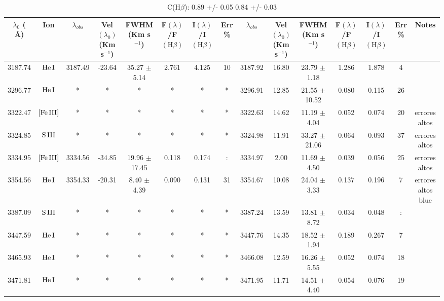 \documentclass{article}
\begin{document}
\begin{table*}
\caption{C(H$\beta$): 0.89 +/- 0.05 0.84 +/- 0.03 } 
\begin{adjustbox}{width=\textwidth}
\label{}
\begin{tabular}{ccccccccccccccc} 
\hline
$\lambda_0$ ( \AA ) & Ion & $\lambda_{obs}$ & Vel$\left( \lambda_0 \right)$ (Km s$^{-1}$) & FWHM (Km s$^{-1}$) & F$\left( \lambda \right)$/F$\left( \mbox{H}\beta \right)$ & I$\left( \lambda \right)$/I$\left( \mbox{H}\beta \right)$ & Err \% & $\lambda_{obs}$ & Vel$\left( \lambda_0 \right)$ (Km s$^{-1}$) & FWHM (Km s$^{-1}$) & F$\left( \lambda \right)$/F$\left( \mbox{H}\beta \right)$ & I$\left( \lambda \right)$/I$\left( \mbox{H}\beta \right)$ & Err \% & Notes \\
\hline
3187.74 & $\mbox{He}\thinspace \mbox{I}$ & 3187.49 & -23.64 & 35.27 $\pm$ 5.14 & 2.761 & 4.125 & 10 & 3187.92 & 16.80 & 23.79 $\pm$ 1.18 & 1.286 & 1.878 & 4 &  \\
3296.77 & $\mbox{He}\thinspace \mbox{I}$ & * & * & * & * & * & * & 3296.91 & 12.85 & 21.55 $\pm$ 10.52 & 0.080 & 0.115 & 26 &  \\
3322.47 & $\mbox{[Fe}\thinspace \mbox{III]}$ & * & * & * & * & * & * & 3322.63 & 14.62 & 11.19 $\pm$ 4.04 & 0.052 & 0.074 & 20 &  errores altos \\
3324.85 & $\mbox{S}\thinspace \mbox{III}$ & * & * & * & * & * & * & 3324.98 & 11.91 & 33.27 $\pm$ 21.06 & 0.064 & 0.093 & 37 &  errores altos \\
3334.95 & $\mbox{[Fe}\thinspace \mbox{III]}$ & 3334.56 & -34.85 & 19.96 $\pm$ 17.45 & 0.118 & 0.174 & : & 3334.97 & 2.00 & 11.69 $\pm$ 4.50 & 0.039 & 0.056 & 25 &  errores altos \\
3354.56 & $\mbox{He}\thinspace \mbox{I}$ & 3354.33 & -20.31 & 8.40 $\pm$ 4.39 & 0.090 & 0.131 & 31 & 3354.67 & 10.08 & 24.04 $\pm$ 3.33 & 0.137 & 0.196 & 7 &  errores altos blue \\
3387.09 & $\mbox{S}\thinspace \mbox{III}$ & * & * & * & * & * & * & 3387.24 & 13.59 & 13.81 $\pm$ 8.72 & 0.034 & 0.048 & : &  \\
3447.59 & $\mbox{He}\thinspace \mbox{I}$ & * & * & * & * & * & * & 3447.76 & 14.35 & 18.52 $\pm$ 1.94 & 0.189 & 0.267 & 7 &  \\
3465.93 & $\mbox{He}\thinspace \mbox{I}$ & * & * & * & * & * & * & 3466.08 & 12.59 & 16.26 $\pm$ 5.55 & 0.052 & 0.074 & 18 &  \\
3471.81 & $\mbox{He}\thinspace \mbox{I}$ & * & * & * & * & * & * & 3471.95 & 11.71 & 14.51 $\pm$ 4.40 & 0.054 & 0.076 & 19 &  \\

\end{tabular}
\end{adjustbox}
\end{table*}
\end{document}

